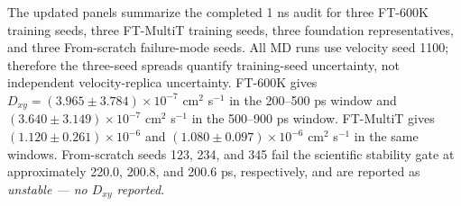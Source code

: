 The updated panels summarize the completed 1 ns audit for three FT-600K training seeds, three FT-MultiT training seeds, three foundation representatives, and three From-scratch failure-mode seeds. All MD runs use velocity seed 1100; therefore the three-seed spreads quantify training-seed uncertainty, not independent velocity-replica uncertainty. FT-600K gives $D_{xy}=(3.965\pm3.784)\times10^{-7}$ cm$^2$ s$^{-1}$ in the 200--500 ps window and $(3.640\pm3.149)\times10^{-7}$ cm$^2$ s$^{-1}$ in the 500--900 ps window. FT-MultiT gives $(1.120\pm0.261)\times10^{-6}$ and $(1.080\pm0.097)\times10^{-6}$ cm$^2$ s$^{-1}$ in the same windows. From-scratch seeds 123, 234, and 345 fail the scientific stability gate at approximately 220.0, 200.8, and 200.6 ps, respectively, and are reported as \emph{unstable --- no $D_{xy}$ reported}.

